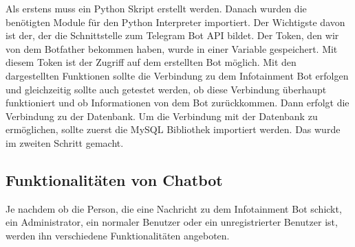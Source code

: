 Als erstens muss ein Python Skript erstellt werden. Danach wurden die benötigten Module für den Python Interpreter importiert.  Der Wichtigste davon ist der, der die Schnittstelle zum Telegram Bot API bildet.
Der Token, den wir von dem Botfather bekommen haben, wurde in einer Variable gespeichert. Mit diesem Token ist der Zugriff auf dem erstellten Bot möglich. Mit den dargestellten Funktionen sollte die Verbindung zu dem Infotainment Bot erfolgen und gleichzeitig sollte auch getestet werden, ob diese Verbindung überhaupt funktioniert und ob Informationen von dem Bot zurückkommen. Dann erfolgt die Verbindung zu der Datenbank. Um die Verbindung mit der Datenbank zu ermöglichen, sollte zuerst die MySQL Bibliothek importiert werden. Das wurde im zweiten Schritt gemacht. 

\subsection{Funktionalitäten von Chatbot}
Je nachdem ob die Person, die eine Nachricht zu dem Infotainment Bot schickt, ein Administrator, ein normaler Benutzer oder ein unregistrierter Benutzer ist, werden ihn verschiedene Funktionalitäten angeboten. 
